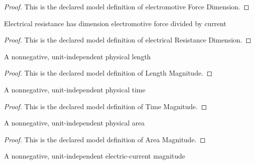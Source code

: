 \begin{proof}
  This is the declared model definition of electromotive Force Dimension.
\end{proof}
\begin{definition}
  \label{def:physics:phyx-mini-0980:phyxminiproblems-problemphyxmini0980-electricalresistancedimension}
  Electrical resistance has dimension electromotive force divided by current
\end{definition}
\begin{proof}
  This is the declared model definition of electrical Resistance Dimension.
\end{proof}
\begin{definition}
  \label{def:physics:phyx-mini-0980:phyxminiproblems-problemphyxmini0980-lengthmagnitude}
  A nonnegative, unit-independent physical length
\end{definition}
\begin{proof}
  This is the declared model definition of Length Magnitude.
\end{proof}
\begin{definition}
  \label{def:physics:phyx-mini-0980:phyxminiproblems-problemphyxmini0980-timemagnitude}
  A nonnegative, unit-independent physical time
\end{definition}
\begin{proof}
  This is the declared model definition of Time Magnitude.
\end{proof}
\begin{definition}
  \label{def:physics:phyx-mini-0980:phyxminiproblems-problemphyxmini0980-areamagnitude}
  A nonnegative, unit-independent physical area
\end{definition}
\begin{proof}
  This is the declared model definition of Area Magnitude.
\end{proof}
\begin{definition}
  \label{def:physics:phyx-mini-0980:phyxminiproblems-problemphyxmini0980-electriccurrentmagnitude}
  A nonnegative, unit-independent electric-current magnitude
\end{definition}
